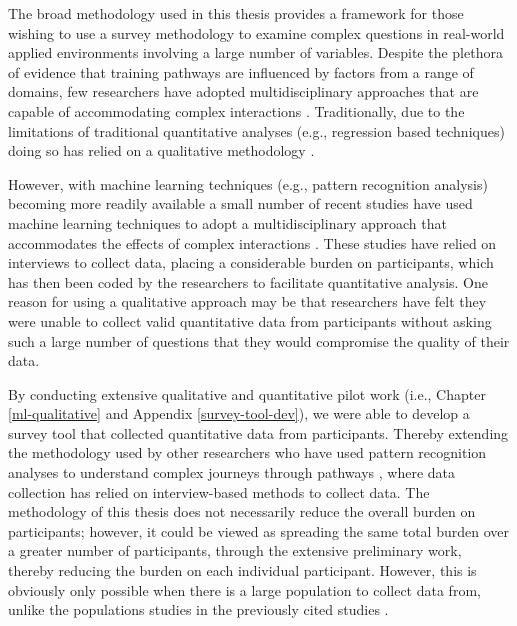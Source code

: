 \documentclass[
  12pt,
  a4paper,
]{book}
\begin{document}
The broad methodology used in this thesis provides a framework for those wishing to use a survey methodology to examine complex questions in real-world applied environments involving a large number of variables. Despite the plethora of evidence that training pathways are influenced by factors from a range of domains, few researchers have adopted multidisciplinary approaches that are capable of accommodating complex interactions \citep[cf.~][]{Rees2016, Gullich2019}. Traditionally, due to the limitations of traditional quantitative analyses (e.g., regression based techniques) doing so has relied on a qualitative methodology \citep[e.g.,][]{Hardy2017}.

However, with machine learning techniques (e.g., pattern recognition analysis) becoming more readily available a small number of recent studies have used machine learning techniques to adopt a multidisciplinary approach that accommodates the effects of complex interactions \citep[e.g.,][]{Gullich2019, Jones2019a, Jones2020}. These studies have relied on interviews to collect data, placing a considerable burden on participants, which has then been coded by the researchers to facilitate quantitative analysis. One reason for using a qualitative approach may be that researchers have felt they were unable to collect valid quantitative data from participants without asking such a large number of questions that they would compromise the quality of their data.

By conducting extensive qualitative and quantitative pilot work (i.e., Chapter \ref{ml-qualitative} and Appendix \ref{survey-tool-dev}), we were able to develop a survey tool that collected quantitative data from participants. Thereby extending the methodology used by other researchers who have used pattern recognition analyses to understand complex journeys through pathways \citep[e.g.,][]{Jones2019a, Jones2020, Gullich2019}, where data collection has relied on interview-based methods to collect data. The methodology of this thesis does not necessarily reduce the overall burden on participants; however, it could be viewed as spreading the same total burden over a greater number of participants, through the extensive preliminary work, thereby reducing the burden on each individual participant. However, this is obviously only possible when there is a large population to collect data from, unlike the populations studies in the previously cited studies \citep[i.e.,][]{Gullich2019, Jones2019a, Jones2020}.
\end{document}
